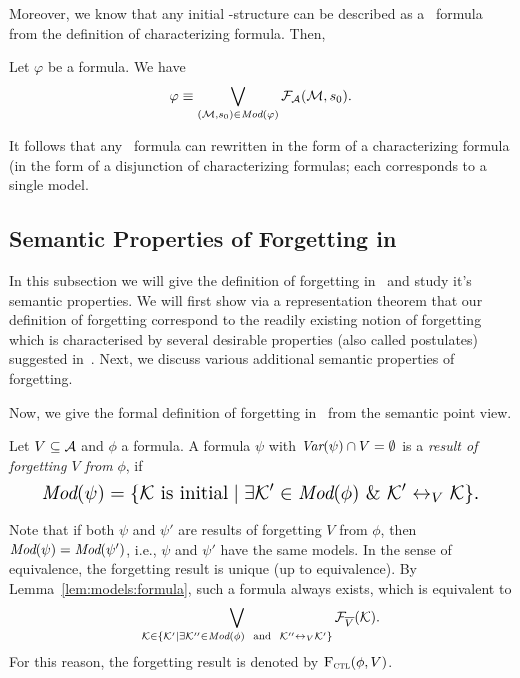 \documentclass{article}
\begin{document}
Moreover, we know that any initial \MPK-structure can be described as a \CTL\ formula from the definition of characterizing formula. Then,
\begin{lemma}\label{lem:models:formula}
  Let $\varphi$ be a formula. We have
  \begin{equation}
    \varphi\equiv \bigvee_{({\cal M}, s_0)\in\textit{Mod}(\varphi)}{\cal F}_{\cal A}({\cal M}, s_0).
\end{equation}
\end{lemma}
It follows that any \CTL\ formula  can rewritten in the form of a  characterizing formula (in the form of a disjunction of characterizing formulas; each corresponds to a single model.







\subsection{Semantic Properties of Forgetting in \CTL}
In this subsection we will give the definition of forgetting in \CTL\ and study it's semantic properties.
 We will first show via a representation theorem that our definition of forgetting correspond to the readily existing notion of forgetting which is characterised by several desirable properties (also called postulates) suggested in~\cite{Yan:AIJ:2009}. Next, we discuss various additional semantic properties of forgetting.

Now, we give the formal definition of forgetting in \CTL\ from the semantic point view.
\begin{definition}[Forgetting]\label{def:V:forgetting}
  Let $V\subseteq\cal A$ and $\phi$ a formula.
A formula $\psi$ with $\textit{Var}(\psi)\cap V=\emptyset$
is a {\em result of forgetting $V$ from} $\phi$, if
\begin{equation}
\resizebox{.91\linewidth}{!}{$
\displaystyle
  \Mod(\psi)=\{{\cal K}\mbox{ is initial}\mid \exists {\cal K}'\in\Mod(\phi)\ \&\ {\cal K}'\lrto_V{\cal K}\}.
  $}
\end{equation}
\end{definition}
Note that if both $\psi$ and $\psi'$ are results of forgetting $V$ from $\phi$, then
$\textit{Mod}(\psi)=\textit{Mod}(\psi')$, i.e., $\psi$ and $\psi'$ have the same models. In the sense
of equivalence, the forgetting result is unique (up to equivalence).
By Lemma~\ref{lem:models:formula}, such a formula always exists, which
is equivalent to
\begin{equation*}
  \bigvee_{{\cal K}\in  \{{\cal K}'\mid \exists {\cal K}''\in\textit{Mod}(\phi)\ \text{ and }\ {\cal K}''\leftrightarrow_V{\cal K}'\}} {\cal F}_{\overline V}({\cal K}).
\end{equation*}
For this reason, the forgetting result is denoted by ${\textsc{F}_{\textsc{ctl}}}(\phi,V)$.
\end{document}

